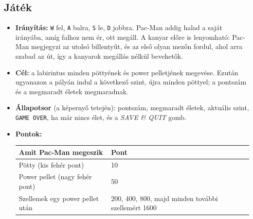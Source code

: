 \documentclass[11pt, a4paper]{article}
\begin{document}
\subsection*{Játék}
\begin{itemize}
    \item \textbf{Irányítás:} \texttt{W} fel, \texttt{A} balra, \texttt{S} le, \texttt{D} jobbra. Pac-Man addig halad a saját irányába, amíg falhoz nem ér, ott megáll. A kanyar előre is lenyomható: Pac-Man megjegyzi az utolsó billentyűt, és az első olyan mezőn fordul, ahol arra szabad az út, így a kanyarok megállás nélkül bevehetők.
    \item \textbf{Cél:} a labirintus minden pöttyének és power pelletjének megevése. Ezután ugyanazon a pályán indul a következő szint, újra minden pöttyel; a pontszám és a megmaradt életek megmaradnak.
    \item \textbf{Állapotsor} (a képernyő tetején): pontszám, megmaradt életek, aktuális szint, \texttt{GAME OVER}, ha már nincs élet, és a \textit{SAVE \& QUIT} gomb.
    \item \textbf{Pontok:}

    \vspace{0.1cm}
    \begin{tabular}{@{}ll@{}}
        \toprule
        \textbf{Amit Pac-Man megeszik} & \textbf{Pont} \\
        \midrule
        Pötty (kis fehér pont) & 10 \\
        Power pellet (nagy fehér pont) & 50 \\
        Szellemek egy power pellet után & 200, 400, 800, majd minden további szellemért 1600 \\
        \bottomrule
    \end{tabular}
    \vspace{0.1cm}


\end{itemize}
\end{document}

